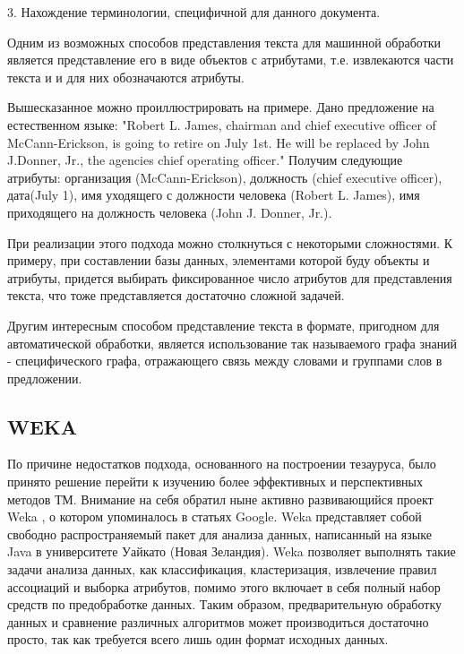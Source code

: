 3. Нахождение терминологии, специфичной для данного документа.

Одним из возможных способов представления текста для машинной обработки является
представление его в виде объектов с атрибутами, т.е. извлекаются части текста и 
и для них обозначаются атрибуты.

Вышесказанное можно проиллюстрировать на примере. Дано предложение на 
естественном языке: "Robert L. James, chairman and chief executive
officer of McCann-Erickson, is going to retire on July 1st.  He will
be replaced by John J.Donner, Jr., the agencies chief operating
officer."  Получим следующие атрибуты: организация (McCann-Erickson),
должность (chief executive officer), дата(July 1), имя уходящего с
должности человека (Robert L. James), имя приходящего на должность
человека (John J. Donner, Jr.).

При реализации этого подхода можно столкнуться с некоторыми сложностями. 
К примеру, при составлении базы данных, элементами которой буду объекты и
атрибуты, придется выбирать фиксированное число атрибутов для представления
текста, что тоже представляется достаточно сложной задачей.

Другим интересным способом представление текста в формате, пригодном для
автоматической обработки, является использование так называемого графа знаний - 
специфического графа, отражающего связь между словами и группами слов в предложении.

\subsection{WEKA}

По причине недостатков подхода, основанного на построении тезауруса, было принято решение перейти к 
изучению более эффективных и перспективных методов ТМ. Внимание на себя обратил ныне активно
развивающийся проект Weka \cite{weka}, о котором упоминалось в статьях Google.
Weka представляет собой свободно распространяемый пакет для анализа данных, 
написанный на языке Java в университете Уайкато (Новая Зеландия). Weka позволяет 
выполнять такие задачи анализа данных, как классификация, кластеризация, извлечение 
правил ассоциаций и выборка атрибутов, помимо этого включает в себя полный набор
средств по предобработке данных. Таким образом, предварительную обработку данных 
и сравнение различных алгоритмов может производиться достаточно просто, так как 
требуется всего лишь один формат исходных данных.



